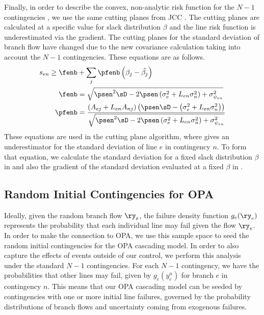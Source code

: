 Finally, in order to describe the convex, non-analytic risk function for the $N-1$ contingencies , we use the same cutting planes from JCC .  The cutting planes are calculated at a specific value for slack distribution $\beta$ and the line risk function is underestimated via the gradient.  The cutting planes for the standard deviation of branch flow have changed due to the new covariance calculation taking into account the $N-1$ contingencies.  These equations are as follows.
\begin{subequations}\label{sd-cuts}
\begin{align}
s_{en} \geq \fenb &+ \sum_j \pfenb \left( \beta_j - \hat{\beta_j} \right) \label{sd-cut}\\
\fenb &= \sqrt{ \psen^2 \sD - 2 \psen \left( \sigma^2_e + L_{en} \sigma^2_n \right) + \sigma^2_{\psi_{en}}} \label{sd-calc}\\
  \pfenb &= \frac{\left(A_{ej} + L_{en}A_{nj}\right) \left( \psen \sD - \left(\sigma^2_e + L_{en} \sigma^2_n \right) \right)}{\sqrt{\psen^2 \sD - 2 \psen \left(\sigma^2_e  + L_{en}\sigma^2_n \right) + \sigma^2_{\psi_{en}} }} \label{sd-deriv}
\end{align}
\end{subequations}
These equations are used in the cutting plane algorithm, where   gives an underestimator for the standard deviation of line $e$ in contingency $n$.  To form that equation, we calculate the standard deviation for a fixed slack distribution $\beta$ in  and also the gradient of the standard deviation evaluated at a fixed $\beta$ in .




\subsection{Random Initial Contingencies for OPA}
Ideally, given the random branch flow $\ry_e$, the failure density function $g_e(\ry_e)$ represents the probability that each individual line may fail given the  flow $\ry_e$.  In order to make the connection to OPA, we use this sample space to seed the random initial contingencies for the OPA cascading model.  In order to also capture the effects of events outside of our control, we perform this analysis under the standard $N-1$ contingencies.  For each $N-1$ contingency, we have the probabilities that other lines may fail, given by $g_e(y_e^n)$ for branch $e$ in contingency $n$.  This means that our OPA cascading model can be seeded by contingencies with one or more initial line failures, governed by the probability distributions of branch flows and uncertainty coming from exogenous failures.  

